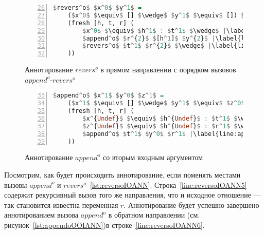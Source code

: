\begin{figure}[h!]
  \begin{center}
  \begin{minipage}{0.4\textwidth}
  \begin{lstlisting}[language=Haskell, frame=single, numbers=left,numberstyle=\small, firstnumber=26, escapechar=|]
  $revers^o$ $x^0$ $y^1$ =
    ($x^0$ $\equiv$ [] $\wedge$ $y^1$ $\equiv$ []) $\vee$ |\label{line:reversoIOANNfail2}|
    (fresh [h, t, r] (
        $x^0$ $\equiv$ $h^1$ : $t^1$ $\wedge$ |\label{line:reversoIOANNfail4}|
        $append^o$ $r^{2}$ $[h^1]$ $y^{2}$ |\label{line:reversoIOANNfail5}|
        $revers^o$ $t^1$ $r^{2}$ $\wedge$ |\label{line:reversoIOANNfail6}|
    ))
    \end{lstlisting}
  \end{minipage}
  \end{center}
  \caption{Аннотирование $revers^o$ в прямом направлении с порядком вызовов $append^o$-$revers^o$}
  \label{lst:reversoIOANNfail}
\end{figure}

\begin{figure}[h!]
  \begin{center}
  \begin{minipage}{0.5\textwidth}
  \begin{lstlisting}[language=Haskell, frame=single, numbers=left,numberstyle=\small, firstnumber=33, escapechar=|]
  $append^o$ $x^1$ $y^0$ $z^1$ =
    ($x^1$ $\equiv$ [] $\wedge$ $y^1$ $\equiv$ $z^0$) $\vee$ |\label{line:appendoOIOANN2}|
    (fresh [h, t, r] (
        $x^{Undef}$ $\equiv$ $h^{Undef}$ : $t^1$ $\wedge$ |\label{line:appendoOIOANNfail4}|
        $z^{Undef}$ $\equiv$ $h^{Undef}$ : $r^1$ $\wedge$ |\label{line:appendoOIOANNfail5}|
        $append^o$ $t^1$ $y^0$ $r^1$ |\label{line:appendoOIOANNfail6}|
    ))
    \end{lstlisting}
  \end{minipage}
  \end{center}
  \caption{Аннотирование $append^o$ со вторым входным аргументом}
  \label{lst:appendoOIOANNfail}
\end{figure}

Посмотрим, как будет происходить аннотирование, если поменять местами вызовы $append^o$ и $revers^o$~\ref{lst:reversoIOANN}.
Строка~\ref{line:reversoIOANN5} содержит рекурсивный вызов того же направления, что и исходное отношение --- так становится известна переменная $r$.
Аннотирование будет успешно завершено аннотированием вызова $append^o$ в обратном направлении (см. рисунок~\ref{lst:appendoOOIANN})в строке~\ref{line:reversoIOANN6}.

